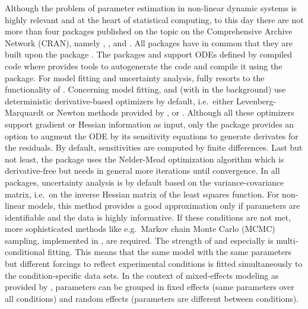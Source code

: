 \documentclass[article]{jss}
\begin{document}
Although the problem of parameter estimation in non-linear dynamic systems is highly relevant and at the heart of statistical computing, to this day there are not more than four  packages published on the topic on the Comprehensive  Archive Network (CRAN), namely  \citep{FME},  \citep{nlmeODE},  \citep{mkin} and  \citep{scaRabee}. All packages have in common that they are built upon the  package \citep{deSolve}.
The packages  and  support ODEs defined by compiled code where  provides tools to autogenerate the  code and compile it using the  package. For model fitting and uncertainty analysis,  fully resorts to the functionality of .
Concerning model fitting,  and  (with  in the background) use deterministic derivative-based optimizers by default, i.e.~either Levenberg-Marquardt or Newton methods provided by ,  or . Although all these optimizers support gradient or Hessian information as input, only the  package provides an option to augment the ODE by its sensitivity equations to generate derivates for the residuals. By default, sensitivities are computed by finite differences. Last but not least, the  package uses the Nelder-Mead optimization algorithm which is derivative-free but needs in general more iterations until convergence.
In all packages, uncertainty analysis is by default based on the variance-covariance matrix, i.e.~on the inverse Hessian matrix of the least squares function. For non-linear models, this method provides a good approximation only if parameters are identifiable and the data is highly informative. If these conditions are not met, more sophisticated methods like e.g.~Markov chain Monte Carlo (MCMC) sampling, implemented in , are required.
The strength of  and especially  is multi-conditional fitting. This means that the same model with the same parameters but different forcings to reflect experimental conditions is fitted simultaneously to the condition-specific data sets. In the context of mixed-effects modeling as provided by , parameters can be grouped in fixed effects (same parameters over all conditions) and random effects (parameters are different between conditions).  
\end{document}
